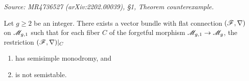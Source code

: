 \begin{theorem}
  \label{thm:counterexample}
  \textit{Source: MR4736527 (arXiv:2202.00039), §1, Theorem counterexample.}

  Let \(g \geq 2\) be an integer. There exists a vector bundle with flat
  connection \((\mathscr{F}, \nabla)\) on \(\mathscr{M}_{g,1}\) such that for each fiber \(C\) of
  the forgetful morphism \(\mathscr{M}_{g,1} \to \mathscr{M}_g\), the restriction
  \((\mathscr{F}, \nabla)|_C\)
  \begin{enumerate}
    \item has semisimple monodromy, and
    \item is not semistable.
  \end{enumerate}
\end{theorem}


